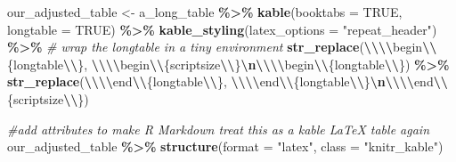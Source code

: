 \documentclass[a4paper, nobind]{templates/ociamthesis}
\newenvironment{Shaded}{\begin{snugshade}}{\end{snugshade}}
\newcommand{\AttributeTok}[1]{\textcolor[rgb]{0.13,0.29,0.53}{#1}}
\newcommand{\CommentTok}[1]{\textcolor[rgb]{0.56,0.35,0.01}{\textit{#1}}}
\newcommand{\ConstantTok}[1]{\textcolor[rgb]{0.56,0.35,0.01}{#1}}
\newcommand{\FunctionTok}[1]{\textcolor[rgb]{0.13,0.29,0.53}{\textbf{#1}}}
\newcommand{\NormalTok}[1]{#1}
\newcommand{\OtherTok}[1]{\textcolor[rgb]{0.56,0.35,0.01}{#1}}
\newcommand{\SpecialCharTok}[1]{\textcolor[rgb]{0.81,0.36,0.00}{\textbf{#1}}}
\newcommand{\StringTok}[1]{\textcolor[rgb]{0.31,0.60,0.02}{#1}}
\renewenvironment{Shaded}
{
  \vspace{10pt}%
  \begin{snugshade}%
}{%
  \end{snugshade}%
  \vspace{8pt}%
}
\begin{document}
\begin{Shaded}
\begin{Highlighting}[]
\NormalTok{our\_adjusted\_table }\OtherTok{\textless{}{-}}\NormalTok{ a\_long\_table }\SpecialCharTok{\%\textgreater{}\%} 
  \FunctionTok{kable}\NormalTok{(}\AttributeTok{booktabs =} \ConstantTok{TRUE}\NormalTok{, }\AttributeTok{longtable =} \ConstantTok{TRUE}\NormalTok{) }\SpecialCharTok{\%\textgreater{}\%} 
  \FunctionTok{kable\_styling}\NormalTok{(}\AttributeTok{latex\_options =} \StringTok{"repeat\_header"}\NormalTok{) }\SpecialCharTok{\%\textgreater{}\%} 
  \CommentTok{\# wrap the longtable in a tiny environment}
  \FunctionTok{str\_replace}\NormalTok{(}\StringTok{\textquotesingle{}}\SpecialCharTok{\textbackslash{}\textbackslash{}\textbackslash{}\textbackslash{}}\StringTok{begin}\SpecialCharTok{\textbackslash{}\textbackslash{}}\StringTok{\{longtable}\SpecialCharTok{\textbackslash{}\textbackslash{}}\StringTok{\}\textquotesingle{}}\NormalTok{, }
              \StringTok{\textquotesingle{}}\SpecialCharTok{\textbackslash{}\textbackslash{}\textbackslash{}\textbackslash{}}\StringTok{begin}\SpecialCharTok{\textbackslash{}\textbackslash{}}\StringTok{\{scriptsize}\SpecialCharTok{\textbackslash{}\textbackslash{}}\StringTok{\}}\SpecialCharTok{\textbackslash{}n\textbackslash{}\textbackslash{}\textbackslash{}\textbackslash{}}\StringTok{begin}\SpecialCharTok{\textbackslash{}\textbackslash{}}\StringTok{\{longtable}\SpecialCharTok{\textbackslash{}\textbackslash{}}\StringTok{\}\textquotesingle{}}\NormalTok{) }\SpecialCharTok{\%\textgreater{}\%}
  \FunctionTok{str\_replace}\NormalTok{(}\StringTok{\textquotesingle{}}\SpecialCharTok{\textbackslash{}\textbackslash{}\textbackslash{}\textbackslash{}}\StringTok{end}\SpecialCharTok{\textbackslash{}\textbackslash{}}\StringTok{\{longtable}\SpecialCharTok{\textbackslash{}\textbackslash{}}\StringTok{\}\textquotesingle{}}\NormalTok{, }
              \StringTok{\textquotesingle{}}\SpecialCharTok{\textbackslash{}\textbackslash{}\textbackslash{}\textbackslash{}}\StringTok{end}\SpecialCharTok{\textbackslash{}\textbackslash{}}\StringTok{\{longtable}\SpecialCharTok{\textbackslash{}\textbackslash{}}\StringTok{\}}\SpecialCharTok{\textbackslash{}n\textbackslash{}\textbackslash{}\textbackslash{}\textbackslash{}}\StringTok{end}\SpecialCharTok{\textbackslash{}\textbackslash{}}\StringTok{\{scriptsize}\SpecialCharTok{\textbackslash{}\textbackslash{}}\StringTok{\}\textquotesingle{}}\NormalTok{)}

\CommentTok{\#add attributes to make R Markdown treat this as a kable LaTeX table again}
\NormalTok{our\_adjusted\_table }\SpecialCharTok{\%\textgreater{}\%} 
  \FunctionTok{structure}\NormalTok{(}\AttributeTok{format =} \StringTok{"latex"}\NormalTok{, }\AttributeTok{class =} \StringTok{"knitr\_kable"}\NormalTok{)}
\end{Highlighting}
\end{Shaded}
\end{document}
